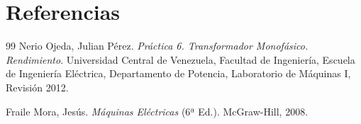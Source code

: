 \section{Referencias}

\begin{thebibliography}{99}
    Nerio Ojeda, Julian Pérez. \textit{Práctica 6. Transformador Monofásico. Rendimiento}. Universidad Central de Venezuela, Facultad de Ingeniería, Escuela de Ingeniería Eléctrica, Departamento de Potencia, Laboratorio de Máquinas I, Revisión 2012.
    
    Fraile Mora, Jesús. \textit{Máquinas Eléctricas} (6ª Ed.). McGraw-Hill, 2008.
\end{thebibliography}